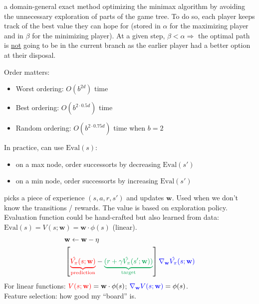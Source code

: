  a domain-general exact method optimizing the minimax
algorithm by avoiding the unnecessary exploration of parts of the game tree. To
do so, each player keeps track of the best value they can hope for (stored in
$\alpha$ for the maximizing player and in $\beta$ for the minimizing player). At
a given step, $\beta < \alpha \Rightarrow$ the optimal path is \underline{not}
going to be in the current branch as the earlier player had a better option at
their disposal.

Order matters:
\begin{itemize}
    \item Worst ordering: $O(b^{2d})$ time
    \item Best ordering: $O(b^{2\cdot0.5d})$ time
    \item Random ordering: $O(b^{2\cdot0.75d})$ time when $b = 2$
\end{itemize}
In practice, can use $\text{Eval}(s)$:\begin{itemize}
    \item on a max node, order successorts by decreasing $\text{Eval}(s')$
    \item on a min node, order successorts by increasing $\text{Eval}(s')$
\end{itemize}

 picks a piece of experience
$(s,a,r,s')$ and updates $\mathbf{w}$. Used when we don't know the transitions /
rewards. The value is based on exploration policy.\\
Evaluation function could be hand-crafted but also learned from data:
$\text{Eval}(s) = V(s;\mathbf{w}) = \mathbf{w}\cdot\phi(s)$ (linear).\\
\begin{displaymath}
\begin{split}
    &\mathbf{w} \leftarrow \mathbf{w} - \eta \\
    &\left[\textcolor{red}{\underbrace{\hat{V_\pi}(s;\mathbf{w})}_{\text{prediction}}}
    - \textcolor{Green}{\underbrace{(r + \gamma
    \hat{V_\pi}(s';\mathbf{w}))}_{\text{target}}}\right]
    \textcolor{blue}{\nabla_{\mathbf{w}}\hat{V_\pi}(s;\mathbf{w})}
\end{split}
\end{displaymath}
For linear functions: $\textcolor{red}{V(s;\mathbf{w})} = \mathbf{w} \cdot
\phi(s)$; $\textcolor{blue}{\nabla_{\mathbf{w}}V(s;\mathbf{w})} = \phi(s)$.
\\
Feature selection: how good my ``board'' is.

